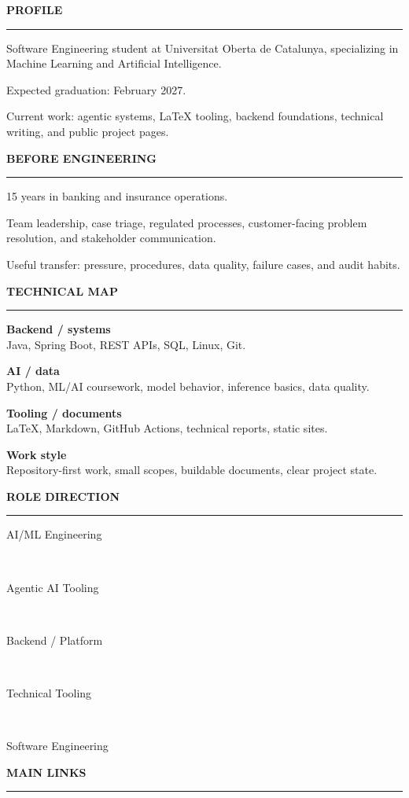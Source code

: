 \documentclass[a4paper,10pt]{article}
\newlength{\RailWidth}
\newlength{\BodyHeight}
\newcommand{\tag}[1]{\scriptsize\colorbox{soft}{\strut\hspace{0.22em}#1\hspace{0.22em}}}
\newcommand{\railsection}[1]{%
	\vspace{3em}%
	{\large\bfseries\ttfamily\MakeUppercase{#1}}\par
	\vspace{.7em}%
	{\color{line}\hrule}%
	\vspace{.7em}%
}
\begin{document}
	\begin{minipage}[t][\BodyHeight]{\RailWidth}
		\scriptsize

		\railsection{Profile}
		Software Engineering student at Universitat Oberta de Catalunya, specializing in Machine Learning and Artificial Intelligence.

		Expected graduation: February 2027.

		Current work: agentic systems, LaTeX tooling, backend foundations, technical writing, and public project pages.\footnotemark

		\railsection{Before engineering}
		15 years in banking and insurance operations.

		Team leadership, case triage, regulated processes, customer-facing problem resolution, and stakeholder communication.

		Useful transfer: pressure, procedures, data quality, failure cases, and audit habits.

		\railsection{Technical map}
		\textbf{Backend / systems}\\
		Java, Spring Boot, REST APIs, SQL, Linux, Git.

		\vspace{0.20em}
		\textbf{AI / data}\\
		Python, ML/AI coursework, model behavior, inference basics, data quality.

		\vspace{0.20em}
		\textbf{Tooling / documents}\\
		\LaTeX, Markdown, GitHub Actions, technical reports, static sites.

		\vspace{0.20em}
		\textbf{Work style}\\
		Repository-first work, small scopes, buildable documents, clear project state.

		\railsection{Role direction}
		\begin{center}
			\tag{AI/ML Engineering}\\[0.32em]
			\tag{Agentic AI Tooling}\\[0.32em]
			\tag{Backend / Platform}\\[0.32em]
			\tag{Technical Tooling}\\[0.32em]
			\tag{Software Engineering}
		\end{center}

		\vspace*{\fill}
		\railsection{Main links}
		\begin{center}
			{}\\[0.35em]
			{}\\[0.35em]
			{}
		\end{center}
	\end{minipage}
\end{document}
